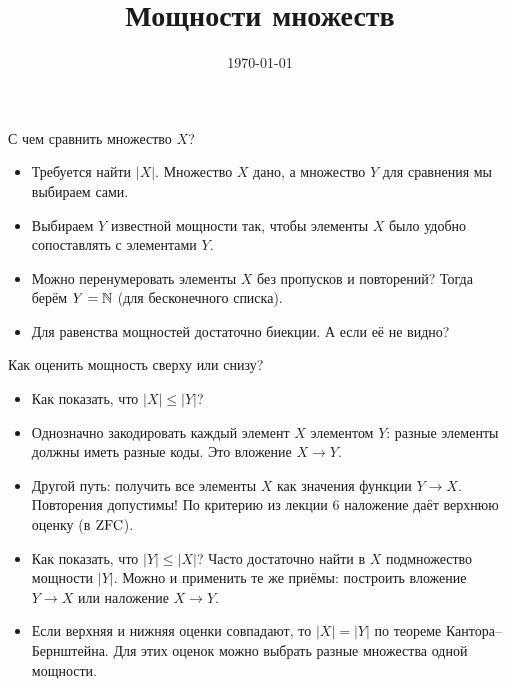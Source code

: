 \documentclass[10pt]{beamer}
\title{Мощности множеств}
\date{\today}
\begin{document}
\begin{frame}[plain]
    \maketitle
\end{frame}

\begin{frame}{С чем сравнить множество $X$?}
    \begin{itemize}
        \item Требуется найти $|X|$. Множество $X$ дано, а множество $Y$ для сравнения мы выбираем сами.
        \item<2-> Выбираем $Y$ известной мощности так, чтобы элементы $X$ было удобно сопоставлять с элементами $Y$.
        \item<3-> Можно перенумеровать элементы $X$ без пропусков и повторений? Тогда берём $Y=\mathbb{N}$ (для бесконечного списка).
        \item<4-> Для равенства мощностей достаточно биекции. А если её не видно?
    \end{itemize}
\end{frame}

\begin{frame}{Как оценить мощность сверху или снизу?}
    \begin{itemize}
        \item Как показать, что $|X|\leq|Y|$?
        \item<2-> Однозначно закодировать каждый элемент $X$ элементом $Y$: разные элементы должны иметь разные коды. Это вложение $X\to Y$.
        \item<3-> Другой путь: получить все элементы $X$ как значения функции $Y\to X$. Повторения допустимы! По критерию из лекции 6 наложение даёт верхнюю оценку (в $\mathrm{ZFC}$).
        \item<4-> Как показать, что $|Y|\leq|X|$? Часто достаточно найти в $X$ подмножество мощности $|Y|$. Можно и применить те же приёмы: построить вложение $Y\to X$ или наложение $X\to Y$.
        \item<5-> Если верхняя и нижняя оценки совпадают, то $|X|=|Y|$ по теореме Кантора--Бернштейна. Для этих оценок можно выбрать разные множества одной мощности.
    \end{itemize}
\end{frame}
\end{document}
